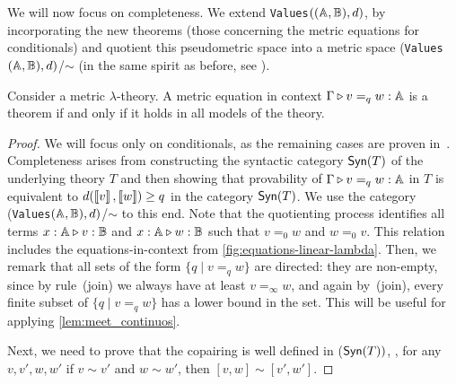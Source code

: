 We will now focus on completeness. We extend  \texttt{Values}$((\mathbb{A},\mathbb{B}),d)$, by incorporating the new theorems (those concerning the metric equations for conditionals) and quotient this pseudometric space into a metric space (\texttt{Values}$(\mathbb{A},\mathbb{B}),d)$/$\sim$ (in the same spirit as before, see ).


\begin{theorem}[Completeness]
Consider a  metric $\lambda$-theory. A metric equation in context
$\Gamma \triangleright v =_{q} w : \mathbb{A}$
is a theorem if and only if it holds in all models of the theory.
\end{theorem}

\begin{proof}
  We will focus only on conditionals, as the remaining cases are proven in~\cite{dahlqvist2023syntactic}.
  Completeness arises from constructing the syntactic category $\mathsf{Syn}(T)$ of the underlying  theory
  $T$ and then showing that provability of $\Gamma \triangleright v =_q w : \mathbb{A}$
  in $T$ is equivalent to $d(\left \llbracket v \right \rrbracket,\left \llbracket w \right \rrbracket) \geq q$ in the category
  $\mathsf{Syn}(T)$. We use the category (\texttt{Values}$(\mathbb{A},\mathbb{B}),d)$/$\sim$ to this end.  Note that the quotienting process identifies all terms $x : \mathbb{A} \triangleright v : \mathbb{B}$ and $x : \mathbb{A} \triangleright w : \mathbb{B}$ such that $v =_0 w$ and $w =_0 v$. This relation includes the equations-in-context from \autoref{fig:equations-linear-lambda}.
     Then, we remark that all sets of the form $\{ q \mid v =_q w \}$ are directed: they are non-empty, since by rule~(join) we always have at least $v =_{\infty} w$, and again by~(join), every finite subset of $\{ q \mid v =_q w \}$ has a lower bound in the set. This will be useful for applying \autoref{lem:meet_continuos}.
   
   Next, we need to prove that the copairing is well defined in ($\mathsf{Syn}(T))$, \ie, for any $v, v', w, w'$ if $v\sim v'$ and $w\sim w'$, then $[v,w] \sim [v',w']$. 


\end{proof}
